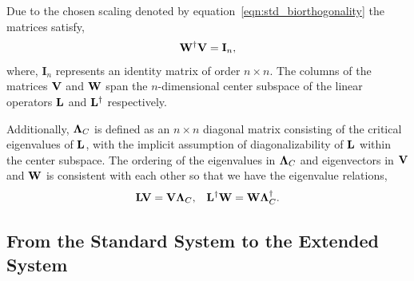 Due to the chosen scaling denoted by equation~\eqref{eqn:std_biorthogonality} the matrices satisfy,
\begin{align}
	\label{eqn:biorthogonal_matrices}
	\mathbf{W}^{\dagger}\mathbf{V} = \mathbf{I}_{n},
\end{align}
where, $\mathbf{I}_{n}$ represents an identity matrix of order $n\times n$. The columns of the matrices $\mathbf{V}$ and $\mathbf{W}$ span the $n$-dimensional center subspace of the linear operators $\mathbf{L}$ and $\mathbf{L}^{\dagger}$ respectively. 

Additionally, $\mathbf{\Lambda}_{C}$ is defined as an $n\times n$ diagonal matrix consisting of the critical eigenvalues of $\mathbf{L}$, with the implicit assumption of diagonalizability of $\mathbf{L}$ within the center subspace. The ordering of the eigenvalues in $\mathbf{\Lambda}_{C}$ and eigenvectors in $\mathbf{V}$ and $\mathbf{W}$ is consistent with each other so that we have the eigenvalue relations,
\begin{align}
	\label{eqn:eigenvalue_relation}
	\mathbf{L}\mathbf{V} = \mathbf{V}\mathbf{\Lambda}_{C}, &&  \mathbf{L}^{\dagger}\mathbf{W} = \mathbf{W}\mathbf{\Lambda}_{C}^{\dagger}.
\end{align}



\subsection{From the Standard System to the Extended System}
\label{sec:extended_system}

